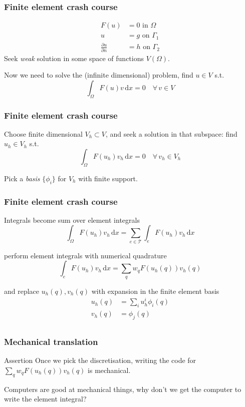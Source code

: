 \documentclass[presentation]{beamer}
\begin{document}
\begin{frame}
  \frametitle{Finite element crash course}
  \begin{align*}
    F(u) &= 0 \text{ in $\Omega$}\\
    u &= g \text{ on $\Gamma_1$}\\
    \frac{\partial u}{\partial n} &= h \text{ on $\Gamma_2$}
  \end{align*}
  Seek \emph{weak} solution in some space of functions $V(\Omega)$.

  Now we need to solve the (infinite dimensional) problem, find $u\in V$ s.t.
  \begin{equation*}
    \int_\Omega \!F(u) v\, \text{d}x = 0 \quad \forall\, v \in V
  \end{equation*}
\end{frame}
\begin{frame}
  \frametitle{Finite element crash course}
  Choose finite dimensional $V_h \subset V$, and seek a solution in
  that subspace: find $u_h \in V_h$ s.t.
  \begin{equation*}
    \int_\Omega \!F(u_h) v_h\, \text{d}x = 0 \quad \forall\, v_h \in V_h
  \end{equation*}

  Pick a \emph{basis} $\{\phi_i\}$ for $V_h$ with finite support.
\end{frame}

\begin{frame}
  \frametitle{Finite element crash course}
  Integrals become sum over element integrals
  \begin{equation*}
    \int_\Omega\! F(u_h) v_h \, \text{d}x =
    \sum_{e \in \mathcal{T}} \int_e\! F(u_h)v_h\, \text{d}x
  \end{equation*}

  perform element integrals with numerical quadrature
  \begin{equation*}
    \int_e F(u_h)v_h\,\text{d}x = \sum_q w_q F(u_h(q)) v_h(q)
  \end{equation*}

  and replace $u_h(q), v_h(q)$ with expansion in the finite element basis
  \begin{align*}
    u_h(q) &= \sum_i u_h^i \phi_i(q)\\
    v_h(q) &= \phi_j(q)\\
  \end{align*}
\end{frame}

\begin{frame}[fragile]
  \frametitle{Mechanical translation}
  \begin{block}{Assertion}
    Once we pick the discretisation, writing the code for $\sum_q w_q
    F(u_h(q)) v_h(q)$ is mechanical.
  \end{block}
  \begin{corollary}
    Computers are good at mechanical things, why don't we get the
    computer to write the element integral?
  \end{corollary}
\end{frame}
\end{document}
